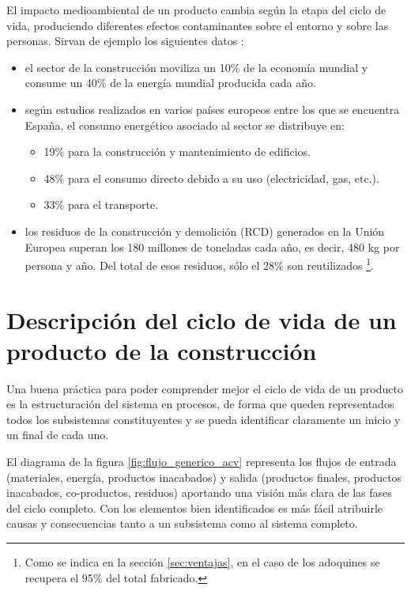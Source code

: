 El impacto medioambiental de un producto cambia según la etapa del ciclo de vida, produciendo diferentes efectos contaminantes sobre el entorno y sobre las personas. Sirvan de ejemplo los siguientes datos \cite{carvalho}:
\begin{itemize}
\item el sector de la construcción moviliza un 10\% de la economía mundial y consume un 40\% de la energía mundial producida cada año.
\item según estudios realizados en varios países europeos entre los que se encuentra España, el consumo energético asociado al sector se distribuye en:
  \begin{itemize}
  \item 19\% para la construcción y mantenimiento de edificios.
  \item 48\% para el consumo directo debido a su uso (electricidad, gas, etc.).
  \item 33\% para el transporte.
  \end{itemize}
  \item los residuos de la construcción y demolición (RCD) generados en la Unión Europea superan los 180 millones de toneladas cada año, es decir, 480 \si{kg} por persona y año. Del total de esos residuos, sólo el 28\% son reutilizados \footnote{Como se indica en la sección \ref{sec:ventajas}, en el caso de los adoquines se recupera el 95\% del total fabricado.}.
\end{itemize}

\section{Descripción del ciclo de vida de un producto de la construcción}
Una buena práctica para poder comprender mejor el ciclo de vida de un producto es la estructuración del sistema en procesos, de forma que queden representados todos los subsistemas constituyentes y se pueda identificar claramente un inicio y un final de cada uno.

El diagrama de la figura \ref{fig:flujo_generico_acv} representa los flujos de entrada (materiales, energía, productos inacabados) y salida (productos finales, productos inacabados, co-productos, residuos) aportando una visión más clara de las fases del ciclo completo. Con los elementos bien identificados es más fácil atribuirle causas y consecuencias tanto a un subsistema como al sistema completo.

